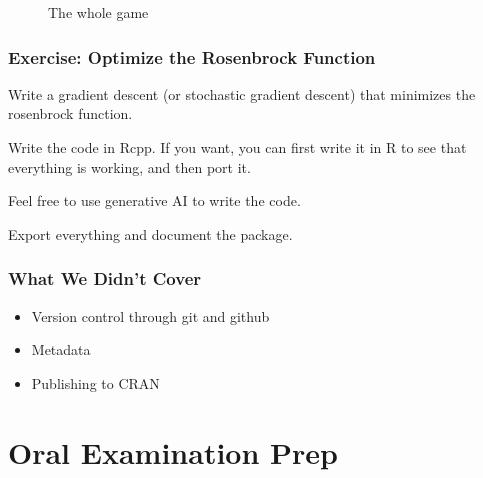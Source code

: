 \documentclass[aspectratio=1610,onlytextwidth]{beamer}
\begin{document}
\begin{frame}[c]
  \begin{figure}[htpb]
    \centering
    \caption{%
      The whole game
    }
  \end{figure}
\end{frame}

\begin{frame}[c]
  \frametitle{Exercise: Optimize the Rosenbrock Function}

  Write a gradient descent (or stochastic gradient descent) that
  minimizes the rosenbrock function.

  \medskip\pause

  Write the code in Rcpp. If you want, you can first write it in R to
  see that everything is working, and then port it.

  \medskip\pause

  Feel free to use generative AI to write the code.

  \medskip\pause

  Export everything and document the package.
\end{frame}

\begin{frame}[c]
  \frametitle{What We Didn't Cover}

  \begin{itemize}[<+->]
    \item Version control through git and github
    \item Metadata
    \item Publishing to CRAN
  \end{itemize}

\end{frame}

\section{Oral Examination Prep}
\end{document}
